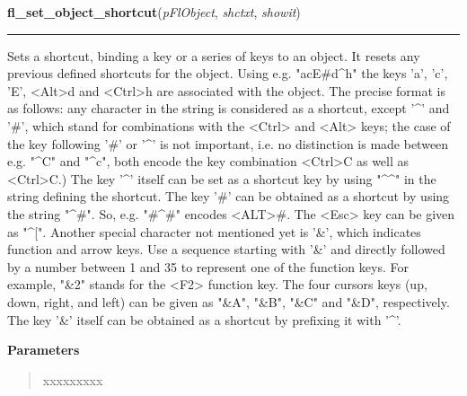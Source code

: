 \hspace{.8\funcindent}\begin{boxedminipage}{\funcwidth}

    \raggedright \textbf{fl\_set\_object\_shortcut}(\textit{pFlObject}, \textit{shctxt}, \textit{showit})

    \vspace{-1.5ex}

    \rule{\textwidth}{0.5\fboxrule}
\setlength{\parskip}{2ex}
    Sets a shortcut, binding a key or a series of keys to an object. It 
    resets any previous defined shortcuts for the object. Using e.g. 
    "acE\#d{\textasciicircum}h" the keys 'a', 'c', 'E', 
    {\textless}Alt{\textgreater}d and {\textless}Ctrl{\textgreater}h are 
    associated with the object. The precise format is as follows: any 
    character in the string is considered as a shortcut, except 
    '{\textasciicircum}' and '\#', which stand for combinations with the 
    {\textless}Ctrl{\textgreater} and {\textless}Alt{\textgreater} keys; 
    the case of the key following '\#' or '{\textasciicircum}' is not 
    important, i.e. no distinction is made between e.g. 
    "{\textasciicircum}C" and "{\textasciicircum}c", both encode the key 
    combination {\textless}Ctrl{\textgreater}C as well as 
    {\textless}Ctrl{\textgreater}C.) The key '{\textasciicircum}' itself 
    can be set as a shortcut key by using 
    "{\textasciicircum}{\textasciicircum}" in the string defining the 
    shortcut. The key '\#' can be obtained as a shortcut by using the 
    string "{\textasciicircum}\#". So, e.g. "\#{\textasciicircum}\#" 
    encodes {\textless}ALT{\textgreater}\#. The 
    {\textless}Esc{\textgreater} key can be given as "{\textasciicircum}[".
    Another special character not mentioned yet is '\&', which indicates 
    function and arrow keys. Use a sequence starting with '\&' and directly
    followed by a number between 1 and 35 to represent one of the function 
    keys. For example, "\&2" stands for the {\textless}F2{\textgreater} 
    function key. The four cursors keys (up, down, right, and left) can be 
    given as "\&A", "\&B", "\&C" and "\&D", respectively. The key '\&' 
    itself can be obtained as a shortcut by prefixing it with 
    '{\textasciicircum}'.

\setlength{\parskip}{1ex}
      \textbf{Parameters}
      \vspace{-1ex}

      \begin{quote}
        \begin{Ventry}{xxxxxxxxx}


\end{Ventry}
\end{quote}
\end{boxedminipage}
